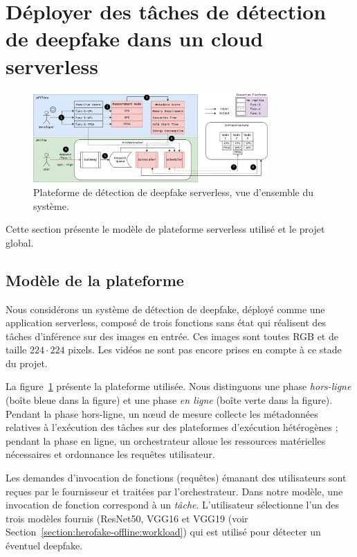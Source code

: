 \section{Déployer des tâches de détection de deepfake dans un cloud serverless}
\label{section:herofake-deepfake}

\begin{figure}[t]
\centering
\includegraphics[width=0.8\textwidth]{4_Chapitre4/figures/placement.png}
\caption{Plateforme de détection de deepfake serverless, vue d'ensemble du système.}
\label{figure:herofake-placement}
\end{figure}

Cette section présente le modèle de plateforme serverless utilisé et le projet global.

\subsection{Modèle de la plateforme}

Nous considérons un système de détection de deepfake, déployé comme une application serverless, composé de trois fonctions sans état qui réalisent des tâches d'inférence sur des images en entrée. Ces images sont toutes RGB et de taille $224 \cdot 224$ pixels. Les vidéos ne sont pas encore prises en compte à ce stade du projet.

La figure~\ref{figure:herofake-placement} présente la plateforme utilisée. Nous distinguons une phase \textit{hors-ligne} (boîte bleue dans la figure) et une phase \textit{en ligne} (boîte verte dans la figure). Pendant la phase hors-ligne, un nœud de mesure collecte les métadonnées relatives à l'exécution des tâches sur des plateformes d'exécution hétérogènes ; pendant la phase en ligne, un orchestrateur alloue les ressources matérielles nécessaires et ordonnance les requêtes utilisateur.

Les demandes d'invocation de fonctions (requêtes) émanant des utilisateurs sont reçues par le fournisseur et traitées par l'orchestrateur. Dans notre modèle, une invocation de fonction correspond à un \textit{tâche}. L'utilisateur sélectionne l'un des trois modèles fournis (ResNet50, VGG16 et VGG19 (voir Section~\ref{section:herofake-offline:workload}) qui est utilisé pour détecter un éventuel deepfake.


